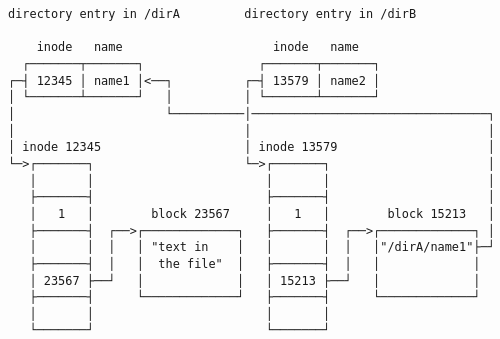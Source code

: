\documentclass[varwidth=50em,crop]{standalone}
\begin{document}
\begin{verbatim}
directory entry in /dirA         directory entry in /dirB

    inode   name                     inode   name
  ┌───────┬───────┐                ┌───────┬───────┐
┌─┤ 12345 │ name1 │<──┐          ┌─┤ 13579 │ name2 │
│ └───────┴───────┘   │          │ └───────┴───────┘
│                     └──────────│─────────────────────────────────┐
│                                │                                 │
│ inode 12345                    │ inode 13579                     │
└─>┌───────┐                     └─>┌───────┐                      │
   │       │                        │       │                      │
   ├───────┤                        ├───────┤                      │
   │   1   │        block 23567     │   1   │        block 15213   │
   ├───────┤  ┌──>┌─────────────┐   ├───────┤  ┌──>┌─────────────┐ │
   │       │  │   │ "text in    │   │       │  │   │"/dirA/name1"├─┘
   ├───────┤  │   │  the file"  │   ├───────┤  │   │             │
   │ 23567 ├──┘   │             │   │ 15213 ├──┘   │             │
   ├───────┤      └─────────────┘   ├───────┤      └─────────────┘
   │       │                        │       │
   └───────┘                        └───────┘
\end{verbatim}
\end{document}
